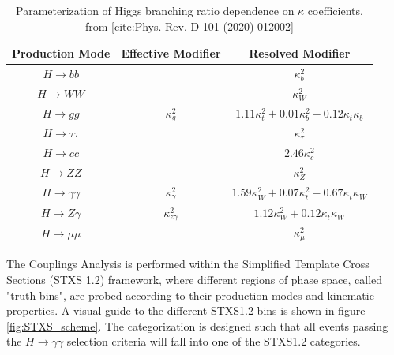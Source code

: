 \begin{table}[h]
    \centering
    \begin{tabular}{ccc}
	Production Mode & Effective Modifier & Resolved Modifier \\ \hline
	$H \rightarrow bb$ & & $\kappa_{b}^2$ \\
	$H \rightarrow WW$ & & $\kappa_{W}^{2}$ \\
	$H \rightarrow gg$ & $\kappa_{g}^{2}$ & $1.11 \kappa_{t}^{2} + 0.01 \kappa_{b}^2 - 0.12 \kappa_{t} \kappa_{b}$ \\
	$H \rightarrow \tau \tau$ & & $\kappa_{\tau}^{2}$ \\
	$H \rightarrow cc$ && $2.46 \kappa_{c}^{2}$ \\
	$H \rightarrow ZZ$ && $\kappa_{Z}^{2}$ \\
	$H \rightarrow \gamma \gamma$ & $\kappa_{\gamma}^{2}$ & $1.59 \kappa_{W}^{2} + 0.07 \kappa_{t}^2 - 0.67 \kappa_{t} \kappa_{W}$ \\
	$H \rightarrow Z \gamma$ & $\kappa_{z \gamma}^{2}$ & $1.12 \kappa_{W}^{2} + 0.12 \kappa_{t} \kappa_{W}$ \\
	$H \rightarrow \mu \mu$ && $\kappa_{\mu}^{2}$ \\
    \end{tabular}
    \caption{Parameterization of Higgs branching ratio dependence on $\kappa$ coefficients, from \ref{cite:Phys. Rev. D 101 (2020) 012002}}
    \label{BRskappa}
\end{table}

The Couplings Analysis is performed within the Simplified Template Cross Sections (STXS 1.2) framework, where different regions of phase space, called "truth bins", are probed according to their production modes and kinematic properties. A visual guide to the different STXS1.2 bins is shown in figure \ref{fig:STXS_scheme}. The categorization is designed such that all events passing the $H \rightarrow \gamma \gamma$ selection criteria will fall into one of the STXS1.2 categories.

